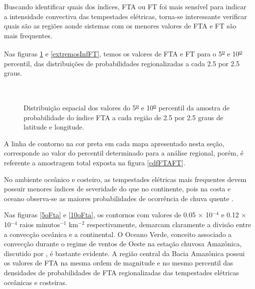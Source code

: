 Buscando identificar quais dos índices, FTA ou FT foi mais sensível para indicar a intensidade convectiva das tempestades elétricas, torna-se interessante verificar quais são as regiões aonde sistemas com os menores valores de FTA e FT são mais frequentes.

Nas figuras \ref{extremosInfFTA} e \ref{extremosInfFT}, temos os valores de FTA e FT  para o 5\textsuperscript{\underline{o}} e 10\textsuperscript{\underline{o}} percentil, das distribuições de probabilidades regionalizadas a cada 2.5 por 2.5 graus.

\begin{figure}
  \\
  \caption{Distribuição espacial dos valores do 5\textsuperscript{\underline{o}} e 10\textsuperscript{\underline{o}} percentil da amostra de probabilidade do índice FTA a cada região de 2.5 por 2.5 graus de latitude e longitude.}
\label{extremosInfFTA}
\end{figure} 

A linha de contorno na cor preta em cada mapa apresentado nesta seção, corresponde ao valor do percentil determinado para a análise regional, porém, é referente a amostragem total exposta na figura \ref{cdfFTAFT}.

No ambiente oceânico e costeiro, as tempestades elétricas mais frequentes devem possuir menores índices de severidade do que no continente, pois na costa e oceano observa-se as maiores probabilidades de ocorrência de chuva quente \cite{Liu2009}. 

Nas figuras \ref{5oFta} e \ref{10oFta}, os contornos com valores de 0.05 $\times$ 10$^{-4}$ e 0.12 $\times$ 10$^{-4}$ raios minutos$^{-1}$
km$^{-2}$ respectivamente, demarcam claramente a divisão entre a convecção oceânica e a continental. O Oceano Verde, conceito associado a convecção durante o regime de ventos de Oeste na estação chuvosa Amazônica, discutido por , é bastante evidente. A região central da Bacia Amazônica possui os  valores de FTA na mesma ordem de magnitude e no mesmo percentil das densidades de probabilidades de FTA regionalizadas das tempestades elétricas oceânicas e costeiras.

